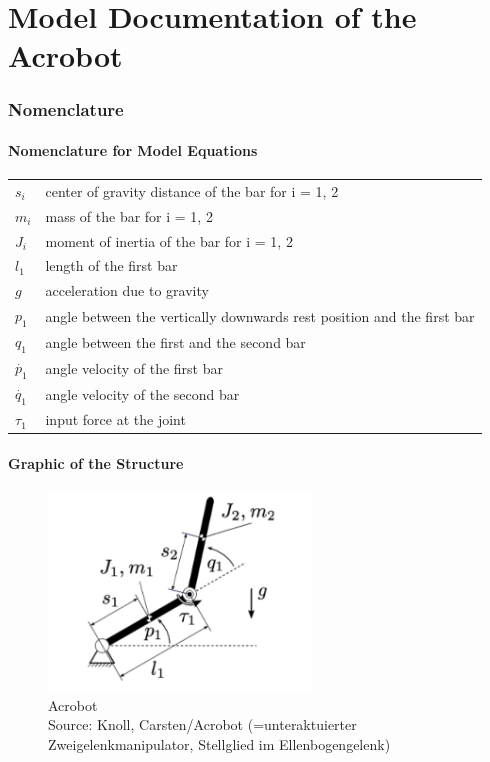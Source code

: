 \documentclass[10pt,a4paper]{article}
\begin{document}
	\part*{Model Documentation of the \\ Acrobot} %
	
	
	\section{Nomenclature} %
	\subsection{Nomenclature for Model Equations} %
	
	\begin{tabular}{ll}
		$s_i$ & center of gravity distance of the bar for i = 1, 2 \\
		$m_i$ & mass of the bar for i = 1, 2 \\
		$J_i$ & moment of inertia of the bar for i = 1, 2 \\
		$l_1$ & length of the first bar \\
		$g$ & acceleration due to gravity \\
		$p_1$ & angle between the vertically downwards rest position and the first bar \\
		$q_1$ & angle between the first and the second bar \\
		$\dot{p_1}$ & angle velocity of the first bar \\
		$\dot{q_1}$ & angle velocity of the second bar \\
		$\tau_1$ & input force at the joint \\
				
	\end{tabular}
	
	\subsection{Graphic of the Structure}	
	\begin{figure}[H]
		\centering
		\captionsetup{justification=centering, margin=1cm}
		\includegraphics[width=70mm]{acrobot.pdf}
		\caption{Acrobot \\ \footnotesize{Source: Knoll, Carsten/Acrobot (=unteraktuierter Zweigelenkmanipulator, Stellglied im Ellenbogengelenk)}}
	\end{figure}
	 
\end{document}
